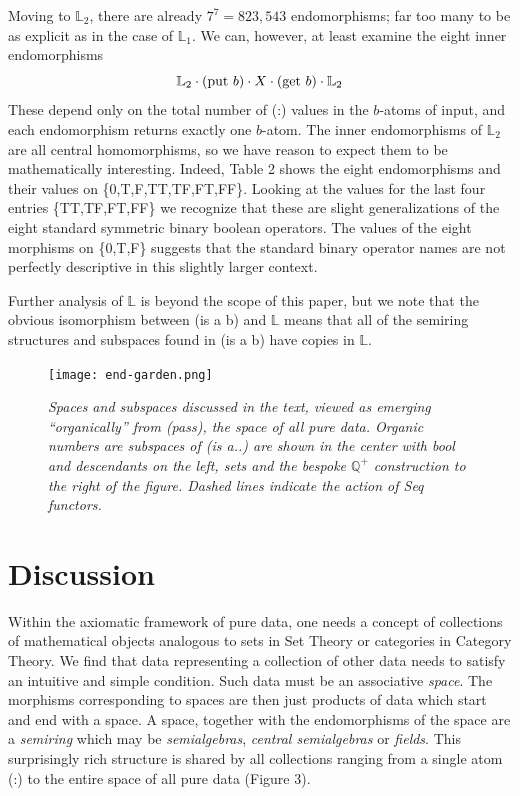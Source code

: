 \documentclass[11pt]{article}
\begin{document}
    Moving to ${\mathbb L}_2$, there are already $7^7=823,543$ endomorphisms; far too many to be as explicit as in the case of ${\mathbb L}_1$.  
 We can, however, at least examine the eight inner endomorphisms 
 \begin{equation}
 {\mathbb L}_2\cdot ({\rm put}\ b)\cdot X \cdot ({\rm get}\ b) \cdot {\mathbb L}_2
 \end{equation}
These depend only on the total number of (:) values in the $b$-atoms of input, and each 
endomorphism returns exactly one $b$-atom.  
The inner endomorphisms of ${\mathbb L}_2$ are all central homomorphisms, so we have reason to expect them to be
mathematically interesting.   
Indeed, Table 2 shows the eight endomorphisms and their values on \{0,T,F,TT,TF,FT,FF\}.  Looking at the values for the last four entries \{TT,TF,FT,FF\} 
we recognize that these are slight generalizations of the eight standard symmetric binary boolean operators.  The values of the eight morphisms 
on \{0,T,F\} suggests that the standard binary operator names are not perfectly descriptive in this slightly larger context.  

    Further analysis of ${\mathbb L}$ is beyond the scope of this paper, but we note that the obvious isomorphism between (is a b) and ${\mathbb L}$ 
means that all of the semiring structures and subspaces found in (is a b) have copies in ${\mathbb L}$.  

\begin{figure}[h]
\centering
\texttt{[image: end-garden.png]}
\caption{{\it Spaces and subspaces discussed in the text, viewed as emerging ``organically'' from (pass), the space of all pure data. 
Organic numbers are subspaces of (is a..) are shown in the center with bool and descendants on the left, sets and the bespoke
${\mathbb Q}^+$ construction to the right of the figure.  Dashed lines indicate the action of Seq functors.}}
\end{figure}

\section{Discussion} 

      Within the axiomatic framework of pure data, one needs a concept of collections of mathematical objects analogous to sets in Set Theory or categories 
in Category Theory.   We find that data representing a collection of other data needs to satisfy an intuitive and simple condition.  Such data must 
be an associative {\it space}.  The morphisms corresponding to spaces are then just products of data which start and end with a space.  
A space, together with the endomorphisms of the space are a {\it semiring} which may be {\it semialgebras}, {\it central semialgebras} or 
{\it fields}.  This surprisingly rich structure is shared by all collections ranging from a single atom (:) to the entire space of all pure data (Figure 3).  
\end{document}
